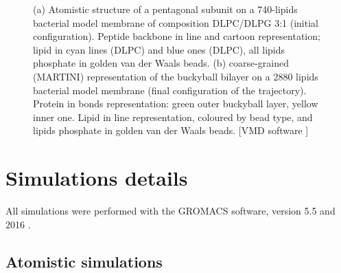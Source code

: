 \begin{figure}[t]
\centering
{}
\caption[Snapshots of multiscale simulations of capzip on model membranes]{(a) Atomistic structure of a pentagonal subunit on a 740-lipids bacterial model membrane of composition DLPC/DLPG 3:1 (initial configuration). Peptide backbone in line and cartoon representation; lipid in cyan lines (DLPC) and blue ones (DLPC), all lipids phosphate in golden van der Waals beads. (b) coarse-grained (MARTINI) representation of the buckyball bilayer on a 2880 lipids bacterial model membrane (final configuration of the trajectory). Protein in bonds representation: green outer buckyball layer, yellow inner one. Lipid in line representation, coloured by bead type, and lipids phosphate in golden van der Waals beads. [VMD software \citet{HUMP96}]}
\label{fig:pL6_vmd}
\end{figure}


\section{Simulations details} \label{sec:details}

All simulations were performed with the GROMACS software, version 5.5 and 2016 \citep{Berendsen1995,Abraham2015,gromacs_man}. 

\subsection{Atomistic simulations}
